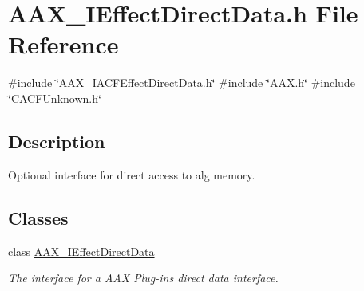 \hypertarget{a00593}{}\section{A\+A\+X\+\_\+\+I\+Effect\+Direct\+Data.\+h File Reference}
\label{a00593}
{\ttfamily \#include \char`\"{}A\+A\+X\+\_\+\+I\+A\+C\+F\+Effect\+Direct\+Data.\+h\char`\"{}}\newline
{\ttfamily \#include \char`\"{}A\+A\+X.\+h\char`\"{}}\newline
{\ttfamily \#include \char`\"{}C\+A\+C\+F\+Unknown.\+h\char`\"{}}\newline


\subsection{Description}
Optional interface for direct access to alg memory. 

\subsection*{Classes}
\begin{DoxyCompactItemize}
\item 
class \mbox{\hyperlink{a01817}{A\+A\+X\+\_\+\+I\+Effect\+Direct\+Data}}
\begin{DoxyCompactList}\small\item\em The interface for a A\+AX Plug-\/in\textquotesingle{}s direct data interface. \end{DoxyCompactList}\end{DoxyCompactItemize}
